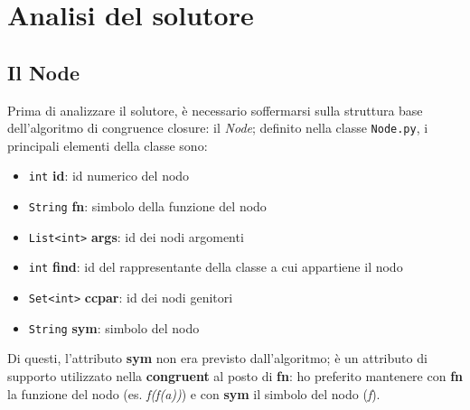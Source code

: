 \chapter{Analisi del solutore}
\section{Il Node}
Prima di analizzare il solutore, è necessario soffermarsi sulla struttura base dell'algoritmo
di congruence closure: il \textit{Node}; definito nella classe \texttt{Node.py}, i principali elementi della classe sono:
\begin{itemize}
    \item \texttt{int} \textbf{id}: id numerico del nodo
    \item \texttt{String} \textbf{fn}: simbolo della funzione del nodo
    \item \texttt{List<int>} \textbf{args}: id dei nodi argomenti
    \item \texttt{int} \textbf{find}: id del rappresentante della classe a cui appartiene il nodo
    \item \texttt{Set<int>} \textbf{ccpar}: id dei nodi genitori
    \item \texttt{String} \textbf{sym}: simbolo del nodo
\end{itemize}
Di questi, l'attributo \textbf{sym} non era previsto dall'algoritmo; è un attributo di supporto utilizzato nella \textbf{congruent}
al posto di \textbf{fn}: ho preferito mantenere con \textbf{fn} la funzione del nodo (es. \textit{f(f(a))}) e con \textbf{sym}
il simbolo del nodo (\textit{f}).

